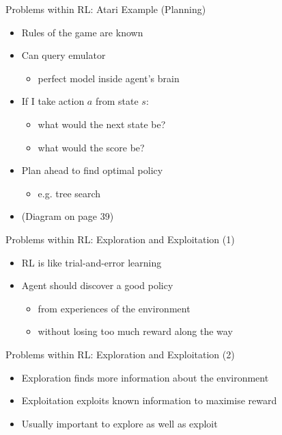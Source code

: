 \documentclass[presentation]{beamer}
\begin{document}
\begin{frame}[label={sec:org07ac79f}]{Problems within RL: Atari Example (Planning)}
\begin{itemize}
\item Rules of the game are known
\item Can query emulator
\begin{itemize}
\item perfect model inside agent’s brain
\end{itemize}
\item If I take action \(a\) from state \(s\):
\begin{itemize}
\item what would the next state be?
\item what would the score be?
\end{itemize}
\item Plan ahead to find optimal policy
\begin{itemize}
\item e.g. tree search
\end{itemize}
\item (Diagram on page 39)
\end{itemize}
\end{frame}
\begin{frame}[label={sec:orgbc2bb03}]{Problems within RL: Exploration and Exploitation (1)}
\begin{itemize}
\item RL is like trial-and-error learning
\item Agent should discover a good policy
\begin{itemize}
\item from experiences of the environment
\item without losing too much reward along the way
\end{itemize}
\end{itemize}
\end{frame}
\begin{frame}[label={sec:orgfc824d9}]{Problems within RL: Exploration and Exploitation (2)}
\begin{itemize}
\item Exploration finds more information about the environment
\item Exploitation exploits known information to maximise reward
\item Usually important to explore as well as exploit
\end{itemize}
\end{frame}
\end{document}
